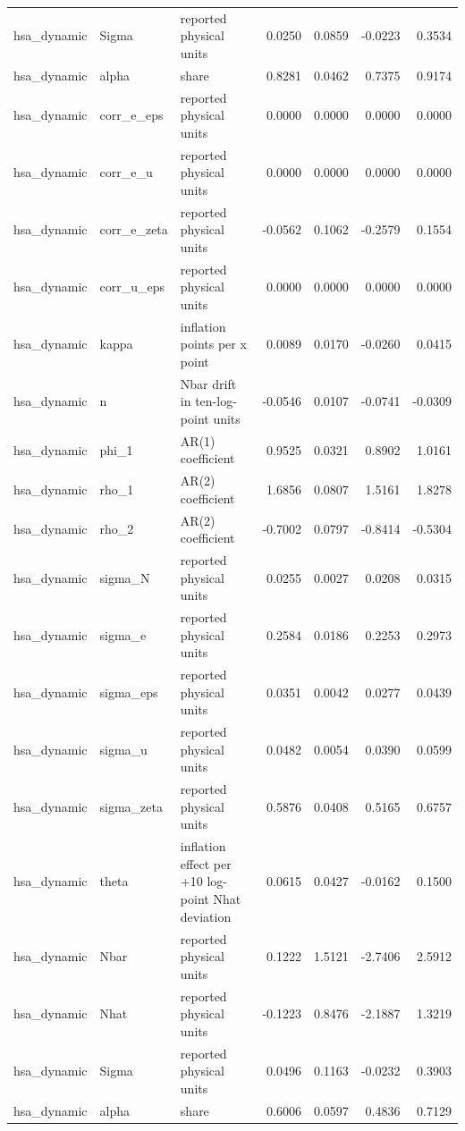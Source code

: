 \begin{tabular}{lllrrrr}
hsa\_dynamic & Sigma & reported physical units & 0.0250 & 0.0859 & -0.0223 & 0.3534 \\
hsa\_dynamic & alpha & share & 0.8281 & 0.0462 & 0.7375 & 0.9174 \\
hsa\_dynamic & corr\_e\_eps & reported physical units & 0.0000 & 0.0000 & 0.0000 & 0.0000 \\
hsa\_dynamic & corr\_e\_u & reported physical units & 0.0000 & 0.0000 & 0.0000 & 0.0000 \\
hsa\_dynamic & corr\_e\_zeta & reported physical units & -0.0562 & 0.1062 & -0.2579 & 0.1554 \\
hsa\_dynamic & corr\_u\_eps & reported physical units & 0.0000 & 0.0000 & 0.0000 & 0.0000 \\
hsa\_dynamic & kappa & inflation points per x point & 0.0089 & 0.0170 & -0.0260 & 0.0415 \\
hsa\_dynamic & n & Nbar drift in ten-log-point units & -0.0546 & 0.0107 & -0.0741 & -0.0309 \\
hsa\_dynamic & phi\_1 & AR(1) coefficient & 0.9525 & 0.0321 & 0.8902 & 1.0161 \\
hsa\_dynamic & rho\_1 & AR(2) coefficient & 1.6856 & 0.0807 & 1.5161 & 1.8278 \\
hsa\_dynamic & rho\_2 & AR(2) coefficient & -0.7002 & 0.0797 & -0.8414 & -0.5304 \\
hsa\_dynamic & sigma\_N & reported physical units & 0.0255 & 0.0027 & 0.0208 & 0.0315 \\
hsa\_dynamic & sigma\_e & reported physical units & 0.2584 & 0.0186 & 0.2253 & 0.2973 \\
hsa\_dynamic & sigma\_eps & reported physical units & 0.0351 & 0.0042 & 0.0277 & 0.0439 \\
hsa\_dynamic & sigma\_u & reported physical units & 0.0482 & 0.0054 & 0.0390 & 0.0599 \\
hsa\_dynamic & sigma\_zeta & reported physical units & 0.5876 & 0.0408 & 0.5165 & 0.6757 \\
hsa\_dynamic & theta & inflation effect per +10 log-point Nhat deviation & 0.0615 & 0.0427 & -0.0162 & 0.1500 \\
hsa\_dynamic & Nbar & reported physical units & 0.1222 & 1.5121 & -2.7406 & 2.5912 \\
hsa\_dynamic & Nhat & reported physical units & -0.1223 & 0.8476 & -2.1887 & 1.3219 \\
hsa\_dynamic & Sigma & reported physical units & 0.0496 & 0.1163 & -0.0232 & 0.3903 \\
hsa\_dynamic & alpha & share & 0.6006 & 0.0597 & 0.4836 & 0.7129 \\

\end{tabular}
